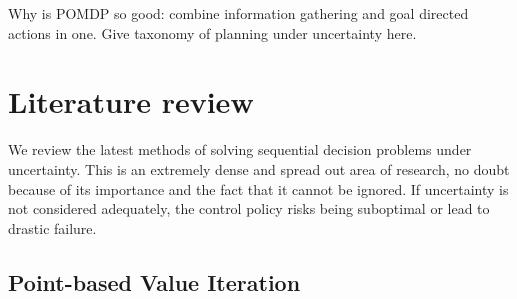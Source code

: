 Why is POMDP so good: combine information gathering and goal directed actions in one. Give taxonomy of planning under uncertainty here.

\section{Literature review}\label{sec:lit_rev}

We review the latest methods of solving sequential decision problems under uncertainty. This is an extremely dense and spread out 
area of research, no doubt because of its importance and the fact that it cannot be ignored. If uncertainty is not considered 
adequately, the control policy risks being suboptimal or lead to drastic failure. 




\subsection{Point-based Value Iteration}

